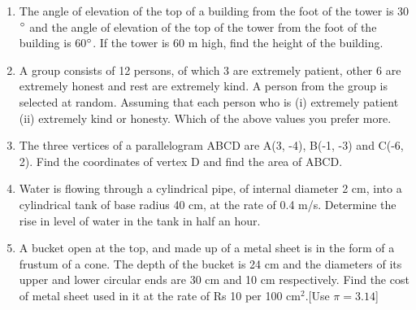 \documentclass[journal,12pt,twocolumn]{IEEEtran}
\renewcommand\thesection{\arabic{section}}
\begin{document}
\begin{enumerate}[label=\thesection.\arabic*.,ref=\thesection.\theenumi]
\item The angle of elevation of the top of a building from the foot of the tower is 30$\degree$ and the angle of elevation of the top of the tower from the foot of the building is 60$\degree$. If the tower is 60 m high, find the height of the building. 
\item A group consists of 12 persons, of which 3 are extremely patient, other 6 are extremely honest and rest are extremely kind. A person from the group is selected at random. Assuming that each person who is (i) extremely patient (ii) extremely kind or honesty. Which of the above values you prefer more.
\item The three vertices of a parallelogram ABCD are A(3, -4), B(-1, -3) and C(-6, 2). Find the coordinates of vertex D and find the area of ABCD.
\item Water is flowing through a cylindrical pipe, of internal diameter 2 cm, into a cylindrical tank of base radius 40 cm, at the rate of 0.4 m/s. Determine the rise in level of water in the tank in half an hour.
\item A bucket open at the top, and made up of a metal sheet is in the form of a frustum of a cone. The depth of the bucket is 24 cm and the diameters of its upper and lower circular ends are 30 cm and 10 cm respectively. Find the cost of metal sheet used in it at the rate of Rs 10 per 100 cm$^2$.[Use $\pi=3.14$]
\end{enumerate}
\end{document}

